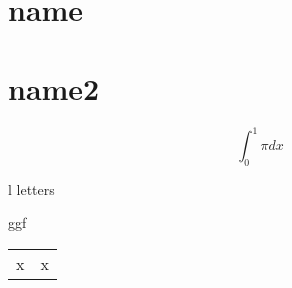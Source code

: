\documentclass{article}
\begin{document}
\section{name}
\section*{name2}



$$\int_0^1\pi dx$$

l letters

ggf

\begin{tabular}{cc}
x & x\\
\end{tabular}
\end{document}
